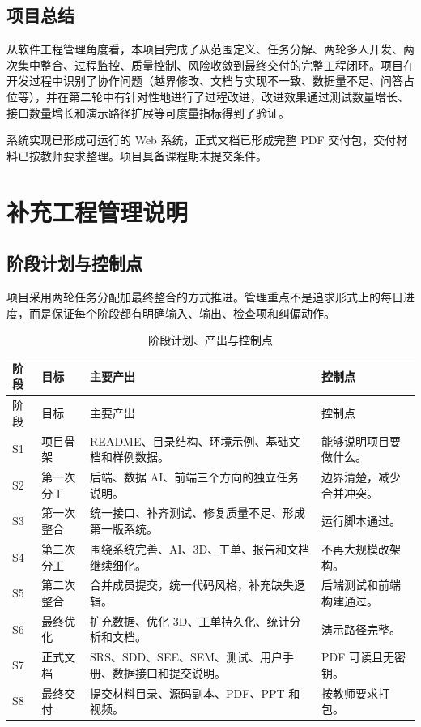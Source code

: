 \documentclass[12pt,a4paper]{ctexart}
\begin{document}
\subsection{项目总结}

从软件工程管理角度看，本项目完成了从范围定义、任务分解、两轮多人开发、两次集中整合、过程监控、质量控制、风险收敛到最终交付的完整工程闭环。项目在开发过程中识别了协作问题（越界修改、文档与实现不一致、数据量不足、问答占位等），并在第二轮中有针对性地进行了过程改进，改进效果通过测试数量增长、接口数量增长和演示路径扩展等可度量指标得到了验证。

系统实现已形成可运行的 Web 系统，正式文档已形成完整 PDF 交付包，交付材料已按教师要求整理。项目具备课程期末提交条件。

\clearpage
\section{补充工程管理说明}
\subsection{阶段计划与控制点}
项目采用两轮任务分配加最终整合的方式推进。管理重点不是追求形式上的每日进度，而是保证每个阶段都有明确输入、输出、检查项和纠偏动作。
\begin{longtable}{L{2.0cm}L{3.2cm}L{5.2cm}L{4.2cm}}
\caption{阶段计划、产出与控制点}\\
\toprule
阶段 & 目标 & 主要产出 & 控制点 \\
\midrule
\endfirsthead
\toprule
阶段 & 目标 & 主要产出 & 控制点 \\
\midrule
\endhead
S1 & 项目骨架 & README、目录结构、环境示例、基础文档和样例数据。 & 能够说明项目要做什么。 \\
S2 & 第一次分工 & 后端、数据 AI、前端三个方向的独立任务说明。 & 边界清楚，减少合并冲突。 \\
S3 & 第一次整合 & 统一接口、补齐测试、修复质量不足、形成第一版系统。 & 运行脚本通过。 \\
S4 & 第二次分工 & 围绕系统完善、AI、3D、工单、报告和文档继续细化。 & 不再大规模改架构。 \\
S5 & 第二次整合 & 合并成员提交，统一代码风格，补充缺失逻辑。 & 后端测试和前端构建通过。 \\
S6 & 最终优化 & 扩充数据、优化 3D、工单持久化、统计分析和文档。 & 演示路径完整。 \\
S7 & 正式文档 & SRS、SDD、SEE、SEM、测试、用户手册、数据接口和提交说明。 & PDF 可读且无密钥。 \\
S8 & 最终交付 & 提交材料目录、源码副本、PDF、PPT 和视频。 & 按教师要求打包。 \\
\bottomrule
\end{longtable}
\end{document}
